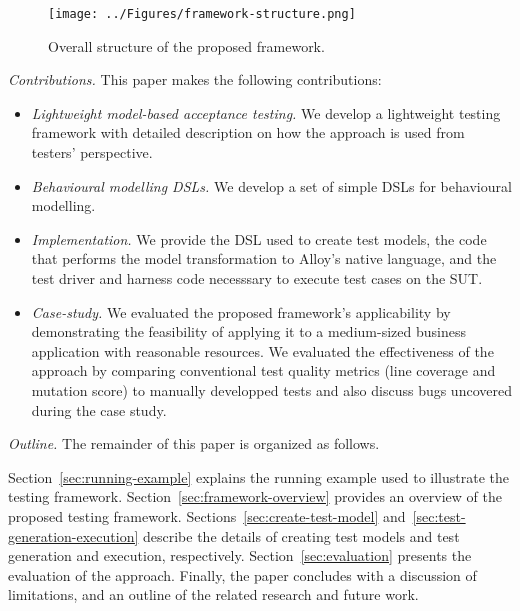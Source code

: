 \begin{figure}[!t]
\centering
\texttt{[image: ../Figures/framework-structure.png]}
\caption{Overall structure of the proposed framework.}
\label{fig:framework-structure}
\end{figure}

\textit{Contributions.} This paper makes the following
contributions:
\begin{itemize}
	\item \textit{Lightweight model-based acceptance testing.} We develop a lightweight testing framework with detailed description on how the approach is used from testers' perspective.
	
	\item \textit{Behavioural modelling DSLs.} We develop a set of simple DSLs for behavioural modelling.
	
	\item \textit{Implementation.} We provide the DSL used to create test models, the code that
	performs the model transformation to Alloy's native language, and the test driver and harness code necesssary to execute test cases on the SUT.

	\item \textit{Case-study. } We evaluated the proposed framework's applicability by demonstrating the feasibility of applying it to 
a medium-sized business application with reasonable resources.
We evaluated the effectiveness of the approach by comparing conventional test quality metrics (line coverage and mutation score)
to manually developped tests and also discuss bugs uncovered during the case study.

\end{itemize}

\textit{Outline.} The remainder of this paper is organized as follows.  %

Section~\ref{sec:running-example} explains the running example used to illustrate the testing framework. Section~\ref{sec:framework-overview} provides an overview of the proposed testing framework. Sections~\ref{sec:create-test-model} and~\ref{sec:test-generation-execution} describe the details of creating test models and test generation and execution, respectively. Section~\ref{sec:evaluation} presents the evaluation of the approach. Finally, the paper concludes with a discussion of limitations, and an outline of the related research and future work.
